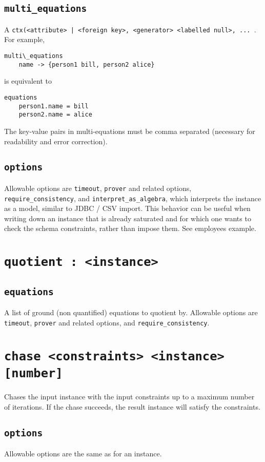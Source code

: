 \documentclass[10pt]{book}
\begin{document}
\subsection{{\tt multi\_equations}}
A {\tt ctx(<attribute> | <foreign key>, {<generator> <labelled null>, ... }}.  For example,
\begin{verbatim}
multi\_equations
	name -> {person1 bill, person2 alice}
\end{verbatim}
is equivalent to
\begin{verbatim}
equations
	person1.name = bill
	person2.name = alice
\end{verbatim}
The key-value pairs in multi-equations must be comma separated (necessary for readability and error correction).

\subsection{{\tt options}}
Allowable options are {\tt timeout}, {\tt prover} and related options, {\tt require\_consistency}, and {\tt interpret\_as\_algebra}, which interprets the instance as a model, similar to JDBC / CSV import.  This behavior can be useful when writing down an instance that is already saturated and for which one wants to check the schema constraints, rather than impose them. See employees example.

\section{{\tt quotient : <instance>}}

\subsection{{\tt equations}}
A list of ground (non quantified) equations to quotient by.  Allowable options are {\tt timeout}, {\tt prover} and related options, and {\tt require\_consistency}.

\section{{\tt chase <constraints> <instance> [number]}}

Chases the input instance with the input constraints up to a maximum number of iterations.  If the chase succeeds, the result instance will satisfy the constraints.

\subsection{{\tt options}}
Allowable options are the same as for an instance.
\end{document}
